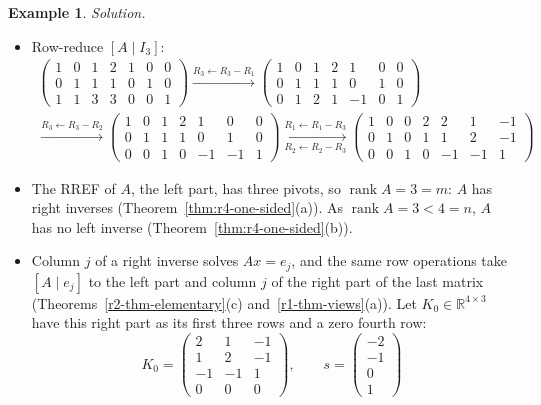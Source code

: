 \documentclass[12pt]{article}
\newcommand{\R}{\mathbb R}
\DeclareMathOperator{\rank}{rank}
\theoremstyle{definition}
\newtheorem{example}[theorem]{Example}
\begin{document}
\begin{example}
\textit{Solution.}
\begin{itemize}
\item Row-reduce \([A\mid I_3]\):
\[
\begin{gathered}
\left(\begin{array}{cccc|ccc}1&0&1&2&1&0&0\\0&1&1&1&0&1&0\\1&1&3&3&0&0&1\end{array}\right)
\xrightarrow{R_3\leftarrow R_3-R_1}
\left(\begin{array}{cccc|ccc}1&0&1&2&1&0&0\\0&1&1&1&0&1&0\\0&1&2&1&-1&0&1\end{array}\right)
\\
\xrightarrow{R_3\leftarrow R_3-R_2}
\left(\begin{array}{cccc|ccc}1&0&1&2&1&0&0\\0&1&1&1&0&1&0\\0&0&1&0&-1&-1&1\end{array}\right)
\xrightarrow[R_2\leftarrow R_2-R_3]{R_1\leftarrow R_1-R_3}
\left(\begin{array}{cccc|ccc}1&0&0&2&2&1&-1\\0&1&0&1&1&2&-1\\0&0&1&0&-1&-1&1\end{array}\right)
\end{gathered}
\]
\item The RREF of \(A\), the left part, has three pivots, so \(\rank A=3=m\): \(A\) has right inverses
(Theorem~\ref{thm:r4-one-sided}(a)). As \(\rank A=3<4=n\), \(A\) has no left inverse (Theorem~\ref{thm:r4-one-sided}(b)).
\item Column \(j\) of a right inverse solves \(Ax=e_j\), and the same row operations take \([A\mid e_j]\) to the left part
and column \(j\) of the right part of the last matrix (Theorems~\ref{r2-thm-elementary}(c) and~\ref{r1-thm-views}(a)).
Let \(K_0\in\R^{4\times3}\) have this right part as its first three rows and a zero fourth row:
\[
K_0=\begin{pmatrix}2&1&-1\\1&2&-1\\-1&-1&1\\0&0&0\end{pmatrix},\qquad s=\begin{pmatrix}-2\\-1\\0\\1\end{pmatrix}
\]
\end{itemize}
\end{example}
\end{document}
